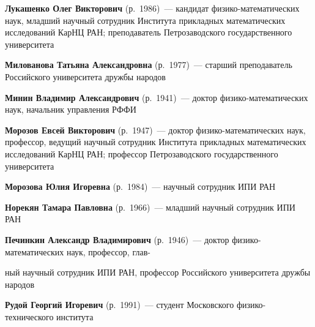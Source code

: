 \begin{multicols}{2}
\vspace*{6pt}

\noindent
\textbf{Лукашенко Олег Викторович} (р.\ 1986)~--- кандидат фи\-зи\-ко-ма\-те\-ма\-ти\-че\-ских 
наук, младший научный сотрудник Института прикладных математических исследований КарНЦ РАН; 
преподаватель Петрозаводского государственного университета

\vspace*{6pt}

\noindent
\textbf{Милованова Татьяна Александровна} (р.\ 1977)~--- старший преподаватель
Российского университета дружбы народов

\vspace*{6pt}

\noindent
\textbf{Минин Владимир Александрович} (р.\ 1941)~--- доктор фи\-зи\-ко-ма\-те\-ма\-ти\-че\-ских 
наук, начальник управления РФФИ

\vspace*{6pt}

\noindent
\textbf{Морозов Евсей Викторович} (р.\ 1947)~--- 
доктор фи\-зи\-ко-ма\-те\-ма\-ти\-че\-ских  наук, профессор,
ведущий научный сотрудник  Института прикладных математических исследований
КарНЦ РАН; профессор Петрозаводского государственного университета

\vspace*{6pt}

\noindent
\textbf{Морозова Юлия Игоревна} (р.\ 1984)~--- научный сотрудник ИПИ РАН

\vspace*{6pt}

\noindent
\textbf{Норекян Тамара Павловна} (р.\ 1966)~---  младший научный сотрудник ИПИ РАН

\vspace*{6pt}

\noindent
\textbf{Печинкин Александр Владимирович} (р.\ 1946)~--- доктор
фи\-зи\-ко-ма\-те\-ма\-ти\-че\-ских наук, профессор, глав-\linebreak\vspace*{-12pt}

\pagebreak

\def\leftkol{ОБ АВТОРАХ}
\def\rightkol{ОБ АВТОРАХ}


\noindent
ный научный сотрудник ИПИ
РАН, профессор Российского университета дружбы народов

\vspace*{2pt}


\noindent
\textbf{Рудой Георгий Игоревич} (р.\ 1991)~--- студент Московского фи\-зи\-ко-тех\-ни\-че\-ско\-го 
института


\end{multicols}
